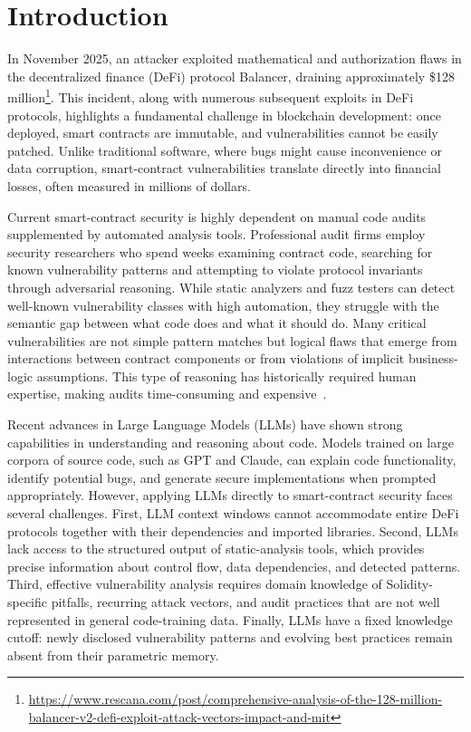 \chapter*{Introduction}
\setcounter{page}{1}

In November 2025, an attacker exploited mathematical and authorization flaws in the decentralized finance (DeFi) protocol Balancer, draining approximately \$128 million\footnote{\url{https://www.rescana.com/post/comprehensive-analysis-of-the-128-million-balancer-v2-defi-exploit-attack-vectors-impact-and-mit}}. This incident, along with numerous subsequent exploits in DeFi protocols, highlights a fundamental challenge in blockchain development: once deployed, smart contracts are immutable, and vulnerabilities cannot be easily patched. Unlike traditional software, where bugs might cause inconvenience or data corruption, smart-contract vulnerabilities translate directly into financial losses, often measured in millions of dollars.

Current smart-contract security is highly dependent on manual code audits supplemented by automated analysis tools. Professional audit firms employ security researchers who spend weeks examining contract code, searching for known vulnerability patterns and attempting to violate protocol invariants through adversarial reasoning. While static analyzers and fuzz testers can detect well-known vulnerability classes with high automation, they struggle with the semantic gap between what code does and what it should do. Many critical vulnerabilities are not simple pattern matches but logical flaws that emerge from interactions between contract components or from violations of implicit business-logic assumptions. This type of reasoning has historically required human expertise, making audits time-consuming and expensive~\cite{perez2021smart}.

Recent advances in Large Language Models (LLMs) have shown strong capabilities in understanding and reasoning about code. Models trained on large corpora of source code, such as GPT and Claude, can explain code functionality, identify potential bugs, and generate secure implementations when prompted appropriately. However, applying LLMs directly to smart-contract security faces several challenges. First, LLM context windows cannot accommodate entire DeFi protocols together with their dependencies and imported libraries. Second, LLMs lack access to the structured output of static-analysis tools, which provides precise information about control flow, data dependencies, and detected patterns. Third, effective vulnerability analysis requires domain knowledge of Solidity-specific pitfalls, recurring attack vectors, and audit practices that are not well represented in general code-training data. Finally, LLMs have a fixed knowledge cutoff: newly disclosed vulnerability patterns and evolving best practices remain absent from their parametric memory.

